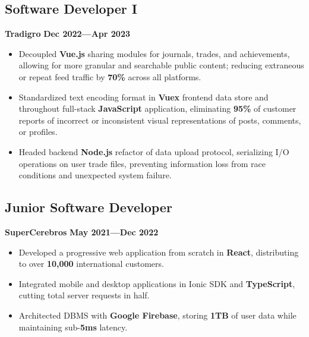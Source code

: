\documentclass{article}
\newcommand{\subsubsectiontext}[1]{
    \hspace*{.5cm}%
    \begin{minipage}{.9\textwidth}%
    #1
    \end{minipage}%
}
\begin{document}
\subsection{Software Developer I} \hfill \textbf{Tradigro} \hfill \textbf{Dec 2022---Apr 2023}
\subsubsectiontext{
    \begin{itemize}[leftmargin=0cm,nosep] 
        \item Decoupled \textbf{Vue.js} sharing modules for journals, trades, and achievements, allowing for more granular and searchable public content; reducing extraneous or repeat feed traffic by \textbf{70\%} across all platforms.
        \item Standardized text encoding format in \textbf{Vuex} frontend data store and throughout full-stack \textbf{JavaScript} application, eliminating \textbf{95\%} of customer reports of incorrect or inconsistent visual representations of posts, comments, or profiles.
        \item Headed backend \textbf{Node.js} refactor of data upload protocol, serializing I/O operations on user trade files, preventing information loss from race conditions and unexpected system failure.
    \end{itemize}
}

\subsection{Junior Software Developer} \hfill \textbf{SuperCerebros} \hfill \textbf{May 2021---Dec 2022}
\subsubsectiontext{
    \begin{itemize}[leftmargin=0cm,nosep] 
        \item Developed a progressive web application from scratch in \textbf{React}, distributing to over \textbf{10,000} international customers.
        \item Integrated mobile and desktop applications in Ionic SDK and \textbf{TypeScript}, cutting total server requests in half.
        \item Architected DBMS with \textbf{Google Firebase}, storing \textbf{1TB} of user data while maintaining sub-\textbf{5ms} latency.
    \end{itemize}
}
\end{document}
